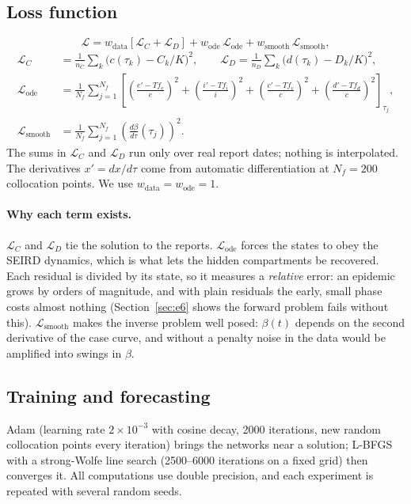 \documentclass[11pt,a4paper]{article}
\begin{document}
\subsection{Loss function}
\begin{equation}
    \mathcal{L} = w_{\text{data}}\left[\mathcal{L}_C + \mathcal{L}_D\right] + w_{\text{ode}}\,\mathcal{L}_{\text{ode}} + w_{\text{smooth}}\,\mathcal{L}_{\text{smooth}},
\end{equation}
\begin{align}
    \mathcal{L}_C &= \frac{1}{n_C}\sum_k \big(c(\tau_k) - C_k/K\big)^2, \qquad
    \mathcal{L}_D = \frac{1}{n_D}\sum_k \big(d(\tau_k) - D_k/K\big)^2, \\
    \mathcal{L}_{\text{ode}} &= \frac{1}{N_f}\sum_{j=1}^{N_f}\left[\left(\frac{e' - T f_e}{e}\right)^2 + \left(\frac{i' - T f_i}{i}\right)^2 + \left(\frac{c' - T f_c}{c}\right)^2 + \left(\frac{d' - T f_d}{c}\right)^2\right]_{\tau_j}, \\
    \mathcal{L}_{\text{smooth}} &= \frac{1}{N_f}\sum_{j=1}^{N_f}\left(\frac{d\beta}{d\tau}(\tau_j)\right)^2 .
\end{align}
The sums in $\mathcal{L}_C$ and $\mathcal{L}_D$ run only over real report dates; nothing is interpolated. The derivatives $x' = dx/d\tau$ come from automatic differentiation at $N_f = 200$ collocation points. We use $w_{\text{data}} = w_{\text{ode}} = 1$.

\paragraph{Why each term exists.} $\mathcal{L}_C$ and $\mathcal{L}_D$ tie the solution to the reports. $\mathcal{L}_{\text{ode}}$ forces the states to obey the SEIRD dynamics, which is what lets the hidden compartments be recovered. Each residual is divided by its state, so it measures a \emph{relative} error: an epidemic grows by orders of magnitude, and with plain residuals the early, small phase costs almost nothing (Section~\ref{sec:e6} shows the forward problem fails without this). $\mathcal{L}_{\text{smooth}}$ makes the inverse problem well posed: $\beta(t)$ depends on the second derivative of the case curve, and without a penalty noise in the data would be amplified into swings in $\beta$.

\subsection{Training and forecasting}
Adam \cite{kingma2015adam} (learning rate $2\times 10^{-3}$ with cosine decay, 2000 iterations, new random collocation points every iteration) brings the networks near a solution; L-BFGS \cite{liu1989limited} with a strong-Wolfe line search (2500--6000 iterations on a fixed grid) then converges it. All computations use double precision, and each experiment is repeated with several random seeds.
\end{document}
